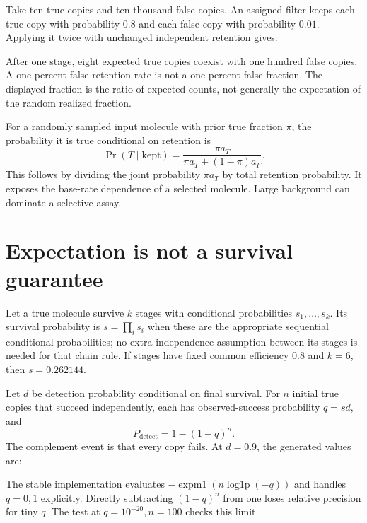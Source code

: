 Take ten true copies and ten thousand false copies. An assigned filter keeps
each true copy with probability $0.8$ and each false copy with probability
$0.01$. Applying it twice with unchanged independent retention gives:
\begin{center}\end{center}
After one stage, eight expected true copies coexist with one hundred false
copies. A one-percent false-retention rate is not a one-percent false fraction.
The displayed fraction is the ratio of expected counts, not generally the
expectation of the random realized fraction.

For a randomly sampled input molecule with prior true fraction $\pi$,
the probability it is true conditional on retention is
\begin{equation}
 \Pr(T\mid\mathrm{kept})=
 \frac{\pi a_T}{\pi a_T+(1-\pi)a_F}.
\end{equation}
This follows by dividing the joint probability $\pi a_T$ by total retention
probability. It exposes the base-rate dependence of a selected molecule.
Large background can dominate a selective assay.

\section{Expectation is not a survival guarantee}
Let a true molecule survive $k$ stages with conditional probabilities
$s_1,\ldots,s_k$. Its survival probability is
$s=\prod_i s_i$ when these are the appropriate sequential conditional
probabilities; no extra independence assumption between its stages is needed
for that chain rule. If stages have fixed common efficiency $0.8$ and $k=6$,
then $s=0.262144$.

Let $d$ be detection probability conditional on final survival. For $n$
initial true copies that succeed independently, each has observed-success
probability $q=sd$, and
\begin{equation}
 P_{\mathrm{detect}}=1-(1-q)^n.
\end{equation}
The complement event is that every copy fails. At $d=0.9$, the generated
values are:
\begin{center}\end{center}
The stable implementation evaluates
$-\operatorname{expm1}(n\operatorname{log1p}(-q))$ and handles $q=0,1$
explicitly. Directly subtracting $(1-q)^n$ from one loses relative precision
for tiny $q$. The test at $q=10^{-20},n=100$ checks this limit.

